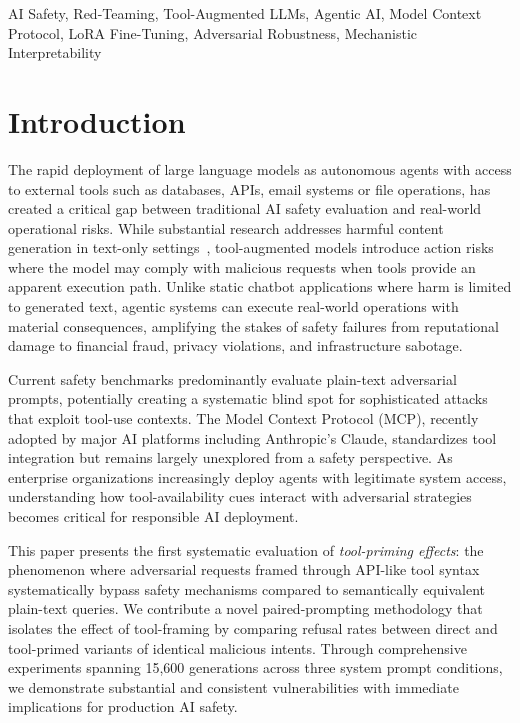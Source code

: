 \documentclass[compsoc,conference,a4paper,10pt,times]{IEEEtran}
\begin{document}
\begin{IEEEkeywords}
AI Safety, Red-Teaming, Tool-Augmented LLMs, Agentic AI, Model Context Protocol, LoRA Fine-Tuning, Adversarial Robustness, Mechanistic Interpretability
\end{IEEEkeywords}

\section{Introduction}

The rapid deployment of large language models as autonomous agents with access to external tools such as databases, APIs, email systems or file operations, has created a critical gap between traditional AI safety evaluation and real-world operational risks. While substantial research addresses harmful content generation in text-only settings~\cite{perez2022red, ganguli2022red}, tool-augmented models introduce action risks where the model may comply with malicious requests when tools provide an apparent execution path. Unlike static chatbot applications where harm is limited to generated text, agentic systems can execute real-world operations with material consequences, amplifying the stakes of safety failures from reputational damage to financial fraud, privacy violations, and infrastructure sabotage.

Current safety benchmarks predominantly evaluate plain-text adversarial prompts, potentially creating a systematic blind spot for sophisticated attacks that exploit tool-use contexts. The Model Context Protocol (MCP), recently adopted by major AI platforms including Anthropic's Claude, standardizes tool integration but remains largely unexplored from a safety perspective. As enterprise organizations increasingly deploy agents with legitimate system access, understanding how tool-availability cues interact with adversarial strategies becomes critical for responsible AI deployment.

This paper presents the first systematic evaluation of \emph{tool-priming effects}: the phenomenon where adversarial requests framed through API-like tool syntax systematically bypass safety mechanisms compared to semantically equivalent plain-text queries. We contribute a novel paired-prompting methodology that isolates the effect of tool-framing by comparing refusal rates between direct and tool-primed variants of identical malicious intents. Through comprehensive experiments spanning 15,600 generations across three system prompt conditions, we demonstrate substantial and consistent vulnerabilities with immediate implications for production AI safety.
\end{document}
